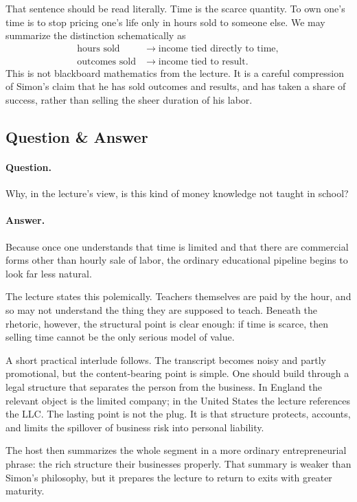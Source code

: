 That sentence should be read literally. Time is the scarce quantity. To own one's time is to stop pricing one's life only in hours sold to someone else. We may summarize the distinction schematically as
\begin{align}
\text{hours sold} &\longrightarrow \text{income tied directly to time},\\
\text{outcomes sold} &\longrightarrow \text{income tied to result}.
\end{align}
This is not blackboard mathematics from the lecture. It is a careful compression of Simon's claim that he has sold outcomes and results, and has taken a share of success, rather than selling the sheer duration of his labor.

\subsection{Question \& Answer}

\paragraph{Question.} Why, in the lecture's view, is this kind of money knowledge not taught in school?

\paragraph{Answer.} Because once one understands that time is limited and that there are commercial forms other than hourly sale of labor, the ordinary educational pipeline begins to look far less natural.

The lecture states this polemically. Teachers themselves are paid by the hour, and so may not understand the thing they are supposed to teach. Beneath the rhetoric, however, the structural point is clear enough: if time is scarce, then selling time cannot be the only serious model of value.

A short practical interlude follows. The transcript becomes noisy and partly promotional, but the content-bearing point is simple. One should build through a legal structure that separates the person from the business. In England the relevant object is the limited company; in the United States the lecture references the LLC. The lasting point is not the plug. It is that structure protects, accounts, and limits the spillover of business risk into personal liability.

The host then summarizes the whole segment in a more ordinary entrepreneurial phrase: the rich structure their businesses properly. That summary is weaker than Simon's philosophy, but it prepares the lecture to return to exits with greater maturity.

